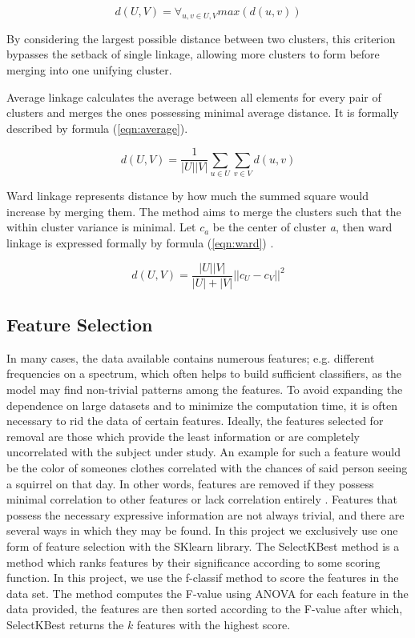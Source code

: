\begin{equation}
\label{eqn:complete}
d(U, V) = \forall_{u, v \in U, V} max(d(u, v))
\end{equation}

By considering the largest possible distance between two clusters, this criterion bypasses the setback of single linkage, allowing more clusters to form before merging into one unifying cluster.

Average linkage calculates the average between all elements for every pair of clusters and merges the ones possessing minimal average distance. It is formally described by formula (\ref{eqn:average}).

\begin{equation}
\label{eqn:average}
d(U, V) = \frac{1}{|U||V|}\sum\limits_{u\in U} \sum\limits_{v\in V}  d(u, v)
\end{equation}

Ward linkage represents distance by how much the summed square would increase by merging them. The method aims to merge the clusters such that the within cluster variance is minimal. Let $c_a$ be the center of cluster \textit{a}, then ward linkage is expressed formally by formula (\ref{eqn:ward}) \cite{shalizi2009distances}.


\begin{equation}
\label{eqn:ward}
d(U, V) = \frac{|U||V|}{|U|+|V|}||c_U - c_V||^2
\end{equation}



\subsection{Feature Selection}

In many cases, the data available contains numerous features; e.g. different frequencies on a spectrum, which often helps to build sufficient classifiers, as the model may find non-trivial patterns among the features. To avoid expanding the dependence on large datasets and to minimize the computation time, it is often necessary to rid the data of certain features.  
Ideally, the features selected for removal are those which provide the least information or are completely uncorrelated with the subject under study. An example for such a feature would be the color of someones clothes correlated with the chances of said person seeing a squirrel on that day. In other words, features are removed if they possess minimal correlation to other features or lack correlation entirely \cite{dash1997feature}. Features that possess the necessary expressive information are not always trivial, and there are several ways in which they may be found. In this project we exclusively use one form of feature selection with the SKlearn library. The SelectKBest method is a method which ranks features by their significance according to some scoring function. In this project, we use the f-classif method to score the features in the data set. The method computes the F-value using ANOVA for each feature in the data provided, the features are then sorted according to the F-value after which, SelectKBest returns the $k$ features with the highest score.


